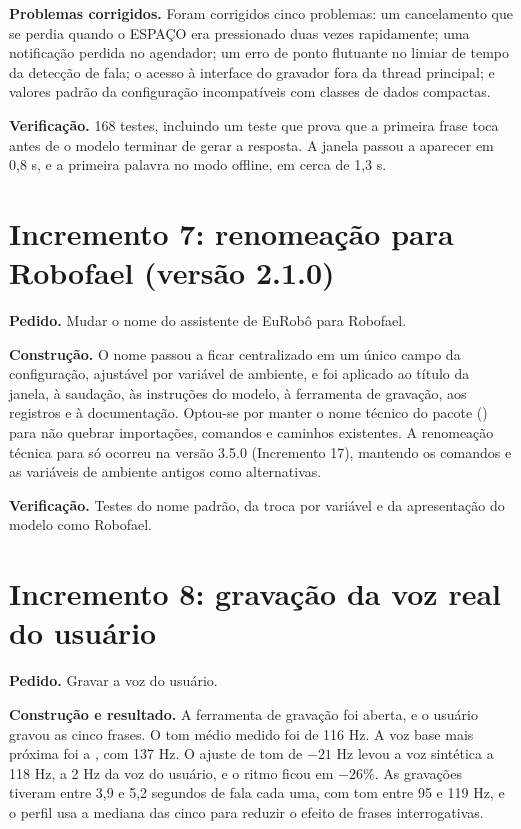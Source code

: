 \textbf{Problemas corrigidos.} Foram corrigidos cinco problemas: um cancelamento que se perdia quando o
ESPAÇO era pressionado duas vezes rapidamente; uma notificação perdida no agendador; um erro de ponto
flutuante no limiar de tempo da detecção de fala; o acesso à interface do gravador fora da thread
principal; e valores padrão da configuração incompatíveis com classes de dados compactas.

\textbf{Verificação.} 168 testes, incluindo um teste que prova que a primeira frase toca antes de o
modelo terminar de gerar a resposta. A janela passou a aparecer em 0,8 s, e a primeira palavra no modo
offline, em cerca de 1,3 s.

\section{Incremento 7: renomeação para Robofael (versão 2.1.0)}

\textbf{Pedido.} Mudar o nome do assistente de EuRobô para Robofael.

\textbf{Construção.} O nome passou a ficar centralizado em um único campo da configuração, ajustável
por variável de ambiente, e foi aplicado ao título da janela, à saudação, às instruções do modelo, à
ferramenta de gravação, aos registros e à documentação. Optou-se por manter o nome técnico do pacote
() para não quebrar importações, comandos e caminhos existentes. A renomeação técnica
para  só ocorreu na versão 3.5.0 (Incremento 17), mantendo os comandos e as variáveis
de ambiente antigos como alternativas.

\textbf{Verificação.} Testes do nome padrão, da troca por variável e da apresentação do modelo como
Robofael.

\section{Incremento 8: gravação da voz real do usuário}

\textbf{Pedido.} Gravar a voz do usuário.

\textbf{Construção e resultado.} A ferramenta de gravação foi aberta, e o usuário gravou as cinco
frases. O tom médio medido foi de 116 Hz. A voz base mais próxima foi a , com
137 Hz. O ajuste de tom de $-21$ Hz levou a voz sintética a 118 Hz, a 2 Hz da voz do usuário, e o ritmo
ficou em $-26\%$. As gravações tiveram entre 3,9 e 5,2 segundos de fala cada uma, com tom entre 95 e
119 Hz, e o perfil usa a mediana das cinco para reduzir o efeito de frases interrogativas.

